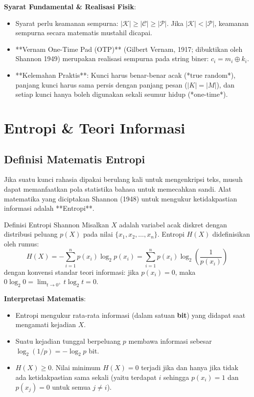 \documentclass[11pt,a4paper]{article}
\begin{document}
\noindent\textbf{Syarat Fundamental \& Realisasi Fisik}:
\begin{itemize}
    \item Syarat perlu keamanan sempurna: $|\mathcal{K}| \ge |\mathcal{C}| \ge |\mathcal{P}|$. Jika $|\mathcal{K}| < |\mathcal{P}|$, keamanan sempurna secara matematis mustahil dicapai.
    \item **Vernam One-Time Pad (OTP)** (Gilbert Vernam, 1917; dibuktikan oleh Shannon 1949) merupakan realisasi sempurna pada string biner: $c_i = m_i \oplus k_i$.
    \item **Kelemahan Praktis**: Kunci harus benar-benar acak (*true random*), panjang kunci harus sama persis dengan panjang pesan ($|K| = |M|$), dan setiap kunci hanya boleh digunakan sekali seumur hidup (*one-time*).
\end{itemize}

\section{Entropi \& Teori Informasi}

\subsection{Definisi Matematis Entropi}
Jika suatu kunci rahasia dipakai berulang kali untuk mengenkripsi teks, musuh dapat memanfaatkan pola statistika bahasa untuk memecahkan sandi. Alat matematika yang diciptakan Shannon (1948) untuk mengukur ketidakpastian informasi adalah **Entropi**.

\begin{conceptbox}{Definisi Entropi Shannon}
Misalkan $X$ adalah variabel acak diskret dengan distribusi peluang $p(X)$ pada nilai $\{x_1, x_2, \dots, x_n\}$. Entropi $H(X)$ didefinisikan oleh rumus:
\begin{equation}
\label{eq:entropy_def}
H(X) = - \sum_{i=1}^n p(x_i) \log_2 p(x_i) = \sum_{i=1}^n p(x_i) \log_2 \left(\frac{1}{p(x_i)}\right)
\end{equation}
dengan konvensi standar teori informasi: jika $p(x_i) = 0$, maka $0 \log_2 0 = \lim_{t \to 0^+} t \log_2 t = 0$.

\vspace{0.3em}
\noindent\textbf{Interpretasi Matematis}:
\begin{itemize}
    \item Entropi mengukur rata-rata informasi (dalam satuan \textbf{bit}) yang didapat saat mengamati kejadian $X$.
    \item Suatu kejadian tunggal berpeluang $p$ membawa informasi sebesar $\log_2(1/p) = -\log_2 p$ bit.
    \item $H(X) \ge 0$. Nilai minimum $H(X) = 0$ terjadi jika dan hanya jika tidak ada ketidakpastian sama sekali (yaitu terdapat $i$ sehingga $p(x_i) = 1$ dan $p(x_j) = 0$ untuk semua $j \neq i$).
\end{itemize}
\end{conceptbox}
\end{document}
